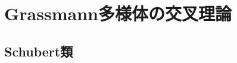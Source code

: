\documentclass{ltjsreport}
\begin{document}
\section{Grassmann多様体の交叉理論}
\subsection{Schubert類}
\end{document}
